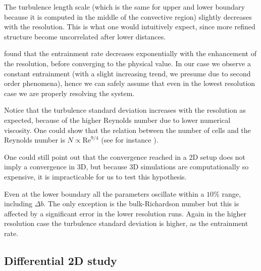 The turbulence length scale (which is the same for upper and lower boundary because it is computed in the middle of the convective region) slightly decreases with the resolution. This is what one would intuitively expect, since more refined structure become uncorrelated after lower distances.

\cite{woodward} found that the entrainment rate decreases exponentially with the enhancement of the resolution, before converging to the physical value. In our case we observe a constant entrainment (with a slight increasing trend, we presume due to second order phenomena), hence we can safely assume that even in the lowest resolution case we are properly resolving the system. 

Notice that the turbulence standard deviation increases with the resolution as expected, because of the higher Reynolds number due to lower numerical viscosity. One could show that the relation between the number of cells and the Reynolds number is $N \propto \mathrm{Re}^{9/4}$ (see for instance \citet{coleman}). 

One could still point out that the convergence reached in a 2D setup does not imply a convergence in 3D, but because 3D simulations are computationally so expensive, it is impracticable for us to test this hypothesis.

Even at the lower boundary all the parameters oscillate within a $10 \%$ range, including $\Delta b$. The only exception is the bulk-Richardson number but this is affected by a significant error in the lower resolution runs. Again in the higher resolution case the turbulence standard deviation is higher, as the entrainment rate.



\subsection{Differential 2D study}

